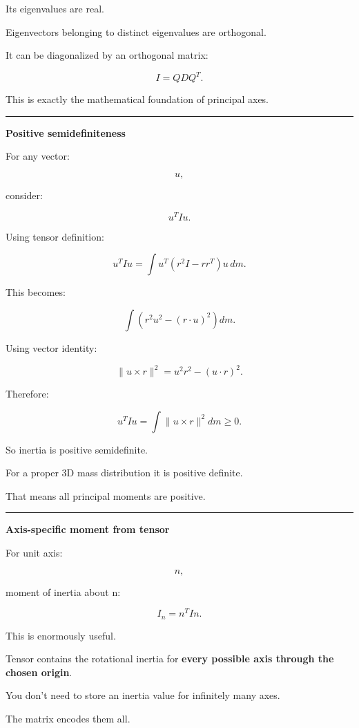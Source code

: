 Its eigenvalues are real.

Eigenvectors belonging to distinct eigenvalues are orthogonal.

It can be diagonalized by an orthogonal matrix:

\[
I=QDQ^T.
\]

This is exactly the mathematical foundation of principal axes.

\begin{center}\rule{0.5\linewidth}{0.5pt}\end{center}

\textbf{Positive semidefiniteness}

For any vector:

\[
u,
\]

consider:

\[
u^TIu.
\]

Using tensor definition:

\[
u^TIu
=
\int
u^T
(r^2I-rr^T)
u\,dm.
\]

This becomes:

\[
\int
(
r^2u^2-(r\cdot u)^2
)
dm.
\]

Using vector identity:

\[
\|u\times r\|^2
=
u^2r^2-(u\cdot r)^2.
\]

Therefore:

\[
\boxed{
u^TIu
=
\int
\|u\times r\|^2dm
\ge0.
}
\]

So inertia is positive semidefinite.

For a proper 3D mass distribution it is positive definite.

That means all principal moments are positive.

\begin{center}\rule{0.5\linewidth}{0.5pt}\end{center}

\textbf{Axis-specific moment from tensor}

For unit axis:

\[
n,
\]

moment of inertia about n:

\[
\boxed{
I_n
=
n^TIn.
}
\]

This is enormously useful.

Tensor contains the rotational inertia for \textbf{every possible axis through the chosen origin}.

You don't need to store an inertia value for infinitely many axes.

The matrix encodes them all.

